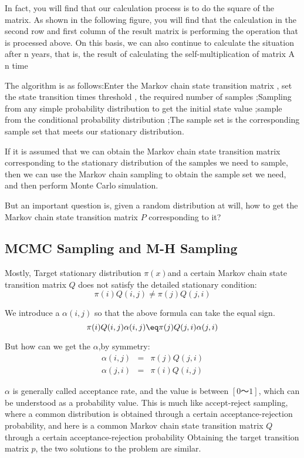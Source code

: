 In fact, you will find that our calculation process is to do the square of the matrix. As shown in the following figure, you will find that the calculation in the second row and first column of the result matrix is ​​performing the operation that is processed above. On this basis, we can also continue to calculate the situation after n years, that is, the result of calculating the self-multiplication of matrix A n time

The algorithm is as follows:Enter the Markov chain state transition matrix , set the state transition times threshold , the required number of samples ;Sampling from any simple probability distribution to get the initial state value ;sample  from the conditional probability distribution ;The sample set is the corresponding sample set that meets our stationary distribution.


If it is assumed that we can obtain the Markov chain state transition matrix corresponding to the stationary distribution of the samples we need to sample, then we can use the Markov chain sampling to obtain the sample set we need, and then perform Monte Carlo simulation.

But an important question is, given a random distribution at will, how to get the Markov chain state transition matrix $P$ corresponding to it?

\subsection{MCMC Sampling and M-H Sampling}
Mostly,
Target stationary distribution $\pi(x)$and a certain Markov chain state transition matrix $Q$ does not satisfy the detailed stationary condition:
\[
  \pi(i)Q(i,j) \neq \pi(j)Q(j,i)
\]


We introduce a $\alpha(i,j)$ so that the above formula can take the equal sign.
\[
  \pi(i)Q(i,j)\alpha(i,j) \eq \pi(j)Q(j,i)\alpha(j,i)
\]

But how can we get the $\alpha$,by symmetry:
\begin{eqnarray*}
\alpha(i,j) &=& \pi(j)Q(j,i)\\
\alpha(j,i) &=& \pi(i)Q(i,j)
\end{eqnarray*}


$\alpha$ is generally called acceptance rate, and the value is between $[0～1]$, which can be understood as a probability value. This is much like accept-reject sampling, where a common distribution is obtained through a certain acceptance-rejection probability, and here is a common Markov chain state transition matrix $Q$ through a certain acceptance-rejection probability Obtaining the target transition matrix $p$, the two solutions to the problem are similar.

